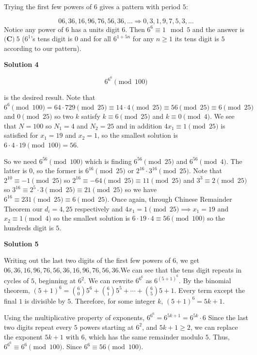\begin{enumerate}
Trying the first few powers of $6$ gives a pattern with period $5$:

 
 \[06, 36, 16, 96, 76, 56, 36, \dots \Rightarrow 0, 3, 1, 9, 7, 5, 3, \dots\]Notice any power of $6$ has a units digit $6$. Then $6^6 \equiv 1 \mod{5}$ and the answer is $\boxed{\textbf{(C)}~5}$ ($6^1$'s tens digit is $0$ and for all $6^{1+5n}$ for any $n \geq 1$ its tens digit is $5$ according to our pattern).

 



\textbf{Solution 4}


 \[6^{6^{6}} \pmod{100}\]

 is the desired result. Note that $6^6 \pmod{100} = 64 \cdot 729 \pmod{25} \equiv 14 \cdot 4 \pmod{25} \equiv 56 \pmod{25} \equiv 6 \pmod{25}$ and $0 \pmod{25}$ so two $k$ satisfy $k \equiv 6\pmod{25}$ and $k \equiv 0 \pmod{4}$. We see that $N = 100$ so $N_1 = 4$ and $N_2 = 25$ and in addition $4x_1 \equiv 1 \pmod{25}$ is satisfied for $x_1 = 19$ and $x_2 = 1$, so the smallest solution is $6 \cdot 4 \cdot 19  \pmod{100} = 56$.

 So we need $6^{56} \pmod{100}$ which is finding $6^{56} \pmod{25}$ and $6^{56} \pmod {4}$. The latter is 0, so the former is $6^{16} \pmod{25}$ or $2^{16} \cdot 3^{16} \pmod{25}$. Note that $2^{10} \equiv -1 \pmod{25}$ so $2^{16} \equiv -64 \pmod{25} \equiv 11 \pmod{25}$ and $3^{3} \equiv 2 \pmod{25}$ so $3^{16} \equiv 2^5 \cdot 3 \pmod{25} \equiv 21 \pmod{25}$ so we have $6^{16} \equiv 231 \pmod{25} \equiv 6 \pmod{25}$. Once again, through Chinese Remainder Theorem our $d_i = 4, 25$ respectively and $4x_1 = 1 \pmod{25} \implies x_1 = 19$ and $x_2 \equiv 1 \pmod{4}$ so the smallest solution is $6 \cdot 19 \cdot 4 \equiv 56 \pmod{100}$ so the hundreds digit is $\boxed{5}$.

 



\textbf{Solution 5}

Writing out the last two digits of the first few powers of $6$, we get $06, 36, 16, 96, 76, 56, 36, 16, 96, 76, 56, 36.$We can see that the tens digit repeats in cycles of $5$, beginning at $6^2$. We can rewrite $6^{6^6}$ as $6^{(5+1)^6}$. By the binomial theorem, $(5+1)^6 = \binom{6}{0}5^6 + \binom{6}{1}5^5 + \cdots + \binom{6}{5}5 + 1.$ Every term except the final $1$ is divisible by $5$. Therefore, for some integer $k$, $(5+1)^6 = 5k+1$.

 Using the multiplicative property of exponents, $6^{6^6} = 6^{5k+1} = 6^{5k}\cdot 6$ Since the last two digits repeat every $5$ powers starting at $6^2$, and $5k+1\geq 2$, we can replace the exponent $5k+1$ with $6$, which has the same remainder modulo $5$. Thus, $6^{6^6} \equiv 6^6 \pmod{100}$. Since $6^6 \equiv 56 \pmod{100}$.


\end{enumerate}
